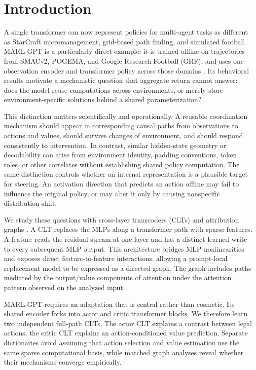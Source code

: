 \section{Introduction}

A single transformer can now represent policies for multi-agent tasks as different as StarCraft micromanagement, grid-based path finding, and simulated football. MARL-GPT is a particularly direct example: it is trained offline on trajectories from SMACv2, POGEMA, and Google Research Football (GRF), and uses one observation encoder and transformer policy across those domains \cite{nesterova2026marlgpt}. Its behavioral results motivate a mechanistic question that aggregate return cannot answer: does the model reuse computations across environments, or merely store environment-specific solutions behind a shared parameterization?

This distinction matters scientifically and operationally. A reusable coordination mechanism should appear in corresponding causal paths from observations to actions and values, should survive changes of environment, and should respond consistently to intervention. In contrast, similar hidden-state geometry or decodability can arise from environment identity, padding conventions, token roles, or other correlates without establishing shared policy computation. The same distinction controls whether an internal representation is a plausible target for steering. An activation direction that predicts an action offline may fail to influence the original policy, or may alter it only by causing nonspecific distribution shift.

We study these questions with cross-layer transcoders (CLTs) and attribution graphs \cite{ameisen2025circuittracing}. A CLT replaces the MLPs along a transformer path with sparse features. A feature reads the residual stream at one layer and has a distinct learned write to every subsequent MLP output. This architecture bridges MLP nonlinearities and exposes direct feature-to-feature interactions, allowing a prompt-local replacement model to be expressed as a directed graph. The graph includes paths mediated by the output/value components of attention under the attention pattern observed on the analyzed input.

MARL-GPT requires an adaptation that is central rather than cosmetic. Its shared encoder forks into actor and critic transformer blocks. We therefore learn two independent full-path CLTs. The actor CLT explains a contrast between legal actions; the critic CLT explains an action-conditioned value prediction. Separate dictionaries avoid assuming that action selection and value estimation use the same sparse computational basis, while matched graph analyses reveal whether their mechanisms converge empirically.

